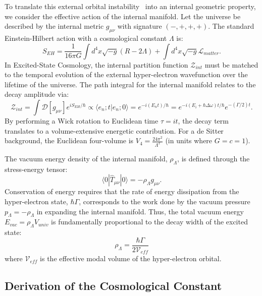 To translate this external orbital instability~\cite{Riess1998} into an internal geometric property, we consider the effective action of the internal manifold. Let the universe be described by the internal metric $g_{\mu\nu}$ with signature $(-,+,+,+)$. The standard Einstein-Hilbert action with a cosmological constant $\Lambda$ is:
\begin{equation}
    S_{EH} = \frac{1}{16\pi G} \int d^4x \sqrt{-g} (R - 2\Lambda) + \int d^4x \sqrt{-g} \mathcal{L}_{matter}.
\end{equation}
In Excited-State Cosmology, the internal partition function $\mathcal{Z}_{int}$ must be matched to the temporal evolution of the external hyper-electron wavefunction over the lifetime of the universe. The path integral for the internal manifold relates to the decay amplitude via:
\begin{equation}
    \mathcal{Z}_{int} = \int \mathcal{D}[g_{\mu\nu}] e^{i S_{EH}/\hbar} \propto \langle e_n; t | e_n; 0 \rangle = e^{-i (E_n t)/\hbar} = e^{-i(E_i + \hbar \Delta\omega)t/\hbar} e^{-(\Gamma/2) t}.
\end{equation}
By performing a Wick rotation to Euclidean time $\tau = i t$, the decay term translates to a volume-extensive energetic contribution. For a de Sitter background, the Euclidean four-volume is $V_4 = \frac{24\pi^2}{\Lambda^2}$ (in units where $G=c=1$). 

The vacuum energy density of the internal manifold, $\rho_\Lambda$, is defined through the stress-energy tensor:
\begin{equation}
    \langle 0 | \hat{T}_{\mu\nu} | 0 \rangle = - \rho_\Lambda g_{\mu\nu}.
\end{equation}
Conservation of energy requires that the rate of energy dissipation from the hyper-electron state, $\hbar \Gamma$, corresponds to the work done by the vacuum pressure $p_\Lambda = -\rho_\Lambda$ in expanding the internal manifold. Thus, the total vacuum energy $E_{vac} = \rho_\Lambda V_{univ}$ is fundamentally proportional to the decay width of the excited state:
\begin{equation}
    \rho_\Lambda = \frac{\hbar \Gamma}{2 \mathcal{V}_{eff}}
\end{equation}
where $\mathcal{V}_{eff}$ is the effective modal volume of the hyper-electron orbital. 

\subsection{Derivation of the Cosmological Constant}

